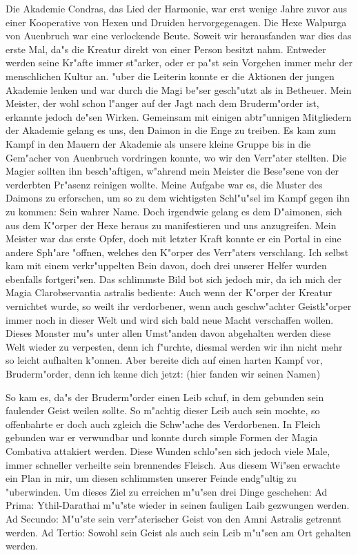 \documentclass[a5paper,8pt]{book}
\begin{document}
Die Akademie Condras, das Lied der Harmonie, war erst wenige Jahre zuvor aus einer Kooperative von Hexen und Druiden hervorgegenagen. Die Hexe Walpurga von Auenbruch war eine verlockende Beute. Soweit wir herausfanden war dies das erste Mal, da"s die Kreatur direkt von einer Person besitzt nahm. Entweder werden seine Kr"afte immer st"arker, oder er pa"st sein Vorgehen immer mehr der menschlichen Kultur an. "uber die Leiterin konnte er die Aktionen der jungen Akademie lenken und war durch die Magi be"ser gesch"utzt als in Betheuer. Mein Meister, der wohl schon l"anger auf der Jagt nach dem Bruderm"order ist, erkannte jedoch de"sen Wirken. Gemeinsam mit einigen abtr"unnigen Mitgliedern der Akademie gelang es uns, den Daimon in die Enge zu treiben. Es kam zum Kampf in den Mauern der Akademie als unsere kleine Gruppe bis in die Gem"acher von Auenbruch vordringen konnte, wo wir den Verr"ater stellten.
Die Magier sollten ihn besch"aftigen, w"ahrend mein Meister die Bese"sene von der verderbten Pr"asenz reinigen wollte. Meine Aufgabe war es, die Muster des Daimons zu erforschen, um so zu dem wichtigsten Schl"u"sel im Kampf gegen ihn zu kommen: Sein wahrer Name.
Doch irgendwie gelang es dem D"aimonen, sich aus dem K"orper der Hexe heraus zu manifestieren und uns anzugreifen. Mein Meister war das erste Opfer, doch mit letzter Kraft konnte er ein Portal in eine andere Sph"are "offnen, welches den K"orper des Verr"aters verschlang. Ich selbst kam mit einem verkr"uppelten Bein davon, doch drei unserer Helfer wurden ebenfalls fortgeri"sen. Das schlimmste Bild bot sich jedoch mir, da ich mich der Magia Clarobservantia astralis bediente: Auch wenn der K"orper der Kreatur vernichtet wurde, so weilt ihr verdorbener, wenn auch geschw"achter Geistk"orper immer noch in dieser Welt und wird sich bald neue Macht verschaffen wollen. Dieses Monster mu"s unter allen Umst"anden davon abgehalten werden diese Welt wieder zu verpesten, denn ich f"urchte, diesmal werden wir ihn nicht mehr so leicht aufhalten k"onnen. Aber bereite dich auf einen harten Kampf vor, Bruderm"order, denn ich kenne dich jetzt: (hier fanden wir seinen Namen)

\vspace{10mm}

So kam es, da"s der Bruderm"order einen Leib schuf, in dem gebunden sein faulender Geist weilen sollte.
So m"achtig dieser Leib auch sein mochte, so offenbahrte er doch auch zgleich die Schw"ache des Verdorbenen.
In Fleich gebunden war er verwundbar und konnte durch simple Formen der Magia Combativa attakiert werden.
Diese Wunden schlo"sen sich jedoch viele Male, immer schneller verheilte sein brennendes Fleisch. Aus diesem Wi"sen erwachte ein Plan in mir, um diesen schlimmsten unserer Feinde endg"ultig zu "uberwinden. Um dieses Ziel zu erreichen m"u"sen drei Dinge geschehen:
Ad Prima: Ythil-Darathai m"u"ste wieder in seinen fauligen Laib gezwungen werden.
Ad Secundo: M"u"ste sein verr"aterischer Geist von den Amni Astralis getrennt werden.
Ad Tertio: Sowohl sein Geist als auch sein Leib m"u"sen am Ort gehalten werden.
\end{document}
